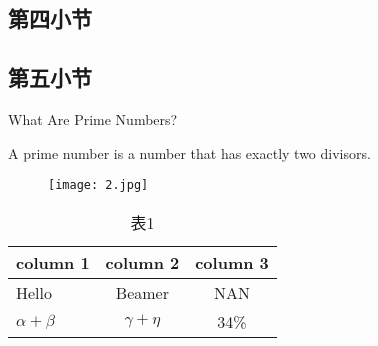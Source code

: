 \documentclass[UTF8,table]{ctexbeamer}
\begin{document}
\subsection{第四小节}
\subsection{第五小节}

\begin{frame}{What Are Prime Numbers?}

	A prime number is a number that has exactly two divisors.
\end{frame}

\begin{frame}
\begin{figure}[tb]
	\centering
	\texttt{[image: 2.jpg]}
\end{figure}	
\end{frame}

\begin{frame}
\begin{table}[tb]
	\centering
	\caption{表1\label{tab:tablename}}
	\begin{tabular}{l|cc} \hline
		\textbf{column 1} & \textbf{column 2} & \textbf{column 3} \\ \hline
		Hello & Beamer & NAN \\ \hline
		$\alpha+\beta$ & $\gamma+\eta$ & 34\% \\ \hline
	\end{tabular}
\end{table}	
\end{frame}
\end{document}
